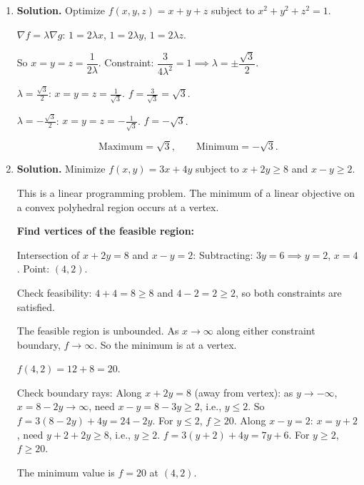 \begin{enumerate}
\begin{enumerate}
    Alternatively, note $f \to +\infty$ (take $x$ large, $z = 1-x-y$) and $f \to -\infty$ (take $z$ large, $x = y = \frac{1-z}{2}$). The constrained function has neither a maximum nor a minimum; $(1,1,-1)$ is a \textbf{saddle point}.
\end{enumerate}

\item \textbf{Solution.}
Optimize $f(x,y,z) = x + y + z$ subject to $x^2 + y^2 + z^2 = 1$.

$\nabla f = \lambda \nabla g$: $1 = 2\lambda x$, $1 = 2\lambda y$, $1 = 2\lambda z$.

So $x = y = z = \dfrac{1}{2\lambda}$. Constraint: $\dfrac{3}{4\lambda^2} = 1 \implies \lambda = \pm\dfrac{\sqrt{3}}{2}$.

$\lambda = \frac{\sqrt{3}}{2}$: $x = y = z = \frac{1}{\sqrt{3}}$. $f = \frac{3}{\sqrt{3}} = \sqrt{3}$.

$\lambda = -\frac{\sqrt{3}}{2}$: $x = y = z = -\frac{1}{\sqrt{3}}$. $f = -\sqrt{3}$.

\[
\boxed{\text{Maximum} = \sqrt{3}, \qquad \text{Minimum} = -\sqrt{3}.}
\]

\item \textbf{Solution.}
Minimize $f(x,y) = 3x + 4y$ subject to $x + 2y \geq 8$ and $x - y \geq 2$.

This is a linear programming problem. The minimum of a linear objective on a convex polyhedral region occurs at a vertex.

\textbf{Find vertices of the feasible region:}

Intersection of $x + 2y = 8$ and $x - y = 2$: Subtracting: $3y = 6 \implies y = 2$, $x = 4$. Point: $(4, 2)$.

Check feasibility: $4 + 4 = 8 \geq 8$ and $4 - 2 = 2 \geq 2$, so both constraints are satisfied.

The feasible region is unbounded. As $x \to \infty$ along either constraint boundary, $f \to \infty$. So the minimum is at a vertex.

$f(4, 2) = 12 + 8 = 20$.

Check boundary rays: Along $x + 2y = 8$ (away from vertex): as $y \to -\infty$, $x = 8 - 2y \to \infty$, need $x - y = 8 - 3y \geq 2$, i.e., $y \leq 2$. So $f = 3(8-2y) + 4y = 24 - 2y$. For $y \leq 2$, $f \geq 20$. Along $x - y = 2$: $x = y + 2$, need $y + 2 + 2y \geq 8$, i.e., $y \geq 2$. $f = 3(y+2) + 4y = 7y + 6$. For $y \geq 2$, $f \geq 20$.

The minimum value is $\boxed{f = 20}$ at $(4, 2)$.


\end{enumerate}
